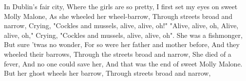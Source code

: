\beginverse
In Dublin's fair city, Where the girls are so pretty,
I first set my eyes on sweet Molly Malone,
As she wheeled her wheel-barrow,
Through streets broad and narrow,
\endverse
\beginchorus
Crying, "Cockles and mussels, alive, alive, oh!"
"Alive, alive, oh, Alive, alive, oh,"
Crying,  "Cockles and mussels, alive, alive, oh".
\endchorus
\beginverse
She was a fishmonger, But sure 'twas no wonder,
For so were her father and mother before,
And they wheeled their barrows,
Through the streets broad and narrow,
\endverse
\beginverse
She died of a fever, And no one could save her,
And that was the end of sweet Molly Malone.
But her ghost wheels her barrow,
Through streets broad and narrow,
\endverse
\endsong